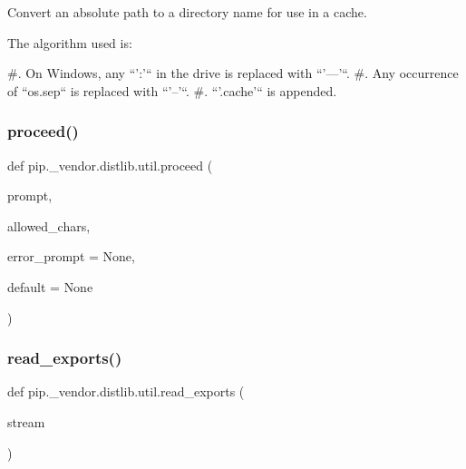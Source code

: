 \begin{DoxyVerb}Convert an absolute path to a directory name for use in a cache.

The algorithm used is:

#. On Windows, any ``':'`` in the drive is replaced with ``'---'``.
#. Any occurrence of ``os.sep`` is replaced with ``'--'``.
#. ``'.cache'`` is appended.
\end{DoxyVerb}
 \mbox{\label{namespacepip_1_1__vendor_1_1distlib_1_1util_a23f445d41b64c0b629f56eb2469d389a}} 
\subsubsection{\texorpdfstring{proceed()}{proceed()}}
{\footnotesize\ttfamily def pip.\+\_\+vendor.\+distlib.\+util.\+proceed (\begin{DoxyParamCaption}\item[{}]{prompt,  }\item[{}]{allowed\+\_\+chars,  }\item[{}]{error\+\_\+prompt = {\ttfamily None},  }\item[{}]{default = {\ttfamily None} }\end{DoxyParamCaption})}

\mbox{\label{namespacepip_1_1__vendor_1_1distlib_1_1util_a24e05fad1ac1d8c59e4dadc3ea24d566}} 
\subsubsection{\texorpdfstring{read\+\_\+exports()}{read\_exports()}}
{\footnotesize\ttfamily def pip.\+\_\+vendor.\+distlib.\+util.\+read\+\_\+exports (\begin{DoxyParamCaption}\item[{}]{stream }\end{DoxyParamCaption})}

\mbox{\label{namespacepip_1_1__vendor_1_1distlib_1_1util_a8d3bae50a5197667faaae01660578931}} 
